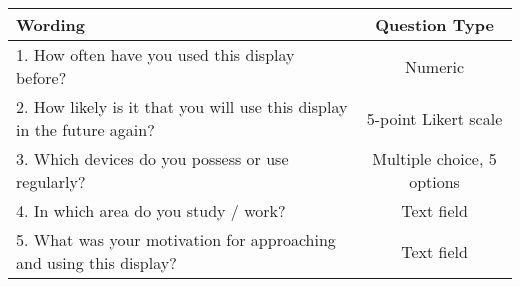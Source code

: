 \begin{tabular}{lc}
\toprule
\textbf{Wording}                                                     & \textbf{Question Type} \\ \midrule
1. How often have you used this display before?                         & Numeric                \\
2. How likely is it that you will use this display in the future again? & 5-point Likert scale   \\
3. Which devices do you possess or use regularly?                       & Multiple choice, 5 options                        \\
4. In which area do you study / work?                                   & Text field             \\
5. What was your motivation for approaching and using this display?     & Text field            \\
\bottomrule
\end{tabular}
